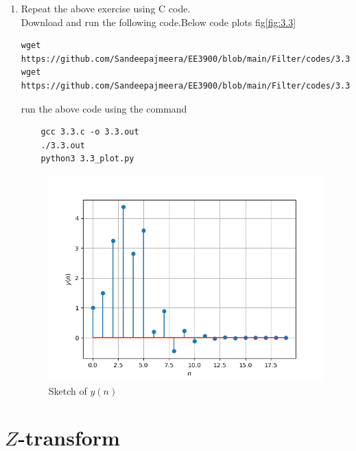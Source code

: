 \documentclass[journal,12pt,twocolumn]{IEEEtran}
\renewcommand\thesection{\arabic{section}}
\begin{document}
\begin{enumerate}[label=\thesection.\arabic*
,ref=\thesection.\theenumi]
\item Repeat the above exercise using C code.\\
\solution Download and run the following code.Below code plots fig\eqref{fig:3.3}
\begin{lstlisting}
wget https://github.com/Sandeepajmeera/EE3900/blob/main/Filter/codes/3.3.c
wget https://github.com/Sandeepajmeera/EE3900/blob/main/Filter/codes/3.3_plot.py
\end{lstlisting}
run the above code using the command
\begin{lstlisting}
	gcc 3.3.c -o 3.3.out
	./3.3.out
	python3 3.3_plot.py
\end{lstlisting}
\begin{figure}[h]
    \centering
    \includegraphics[width=\columnwidth]{./figs/3.3_plot.png}
    \caption{Sketch of $y(n)$}
    \label{fig:3.3}
\end{figure}


\end{enumerate}

\section{$Z$-transform}
\end{document}
